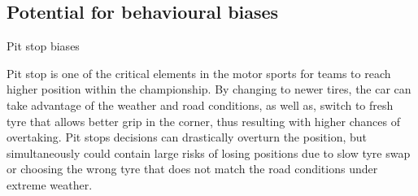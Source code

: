 \subsection{Potential for behavioural biases}

\label{sec:leader-delta}
Pit stop biases

Pit stop is one of the critical elements in the motor sports for teams to reach higher
position within the championship. By changing to newer tires, the car can take advantage
of the weather and road conditions, as well as, switch to fresh tyre that allows better
grip in the corner, thus resulting with higher chances of overtaking. Pit stops
decisions can drastically overturn the position, but simultaneously could contain large
risks of losing positions due to slow tyre swap or choosing the wrong tyre that does not
match the road conditions under extreme weather.

